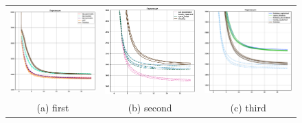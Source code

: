 \begin{figure} 

\begin{tabular}{ccc} 

    \includegraphics[width=55mm]{images/CH4_baselines_PerplexityScore.eps} &   \includegraphics[width=55mm]{images/CH4_vs_regularized_PerplexityScore.eps} & \includegraphics[width=55mm]{images/CH4_improved_PerplexityScore.eps} \\ 

    (a) first & (b) second & (c) third \\[6pt] 

\end{tabular} 

\label{fig:Perple3x} 

\end{figure} 

 

 

 

